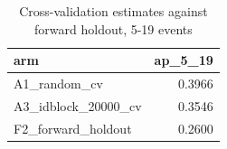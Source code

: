 \begin{table}
\caption{Cross-validation estimates against forward holdout, 5-19 events}
\label{tab:tab_split_audit_final}
\begin{tabular}{lr}
\toprule
arm & ap\_5\_19 \\
\midrule
A1\_random\_cv & 0.3966 \\
A3\_idblock\_20000\_cv & 0.3546 \\
F2\_forward\_holdout & 0.2600 \\
\bottomrule
\end{tabular}
\end{table}
